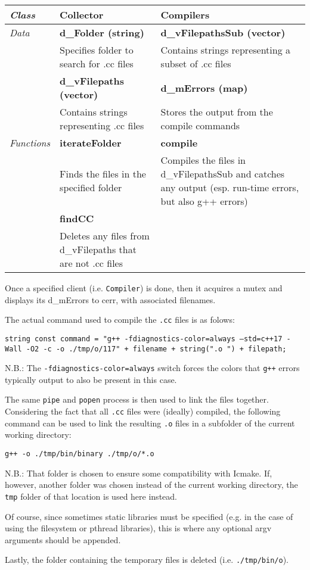 \begin{table}[H]
\begin{tabularx}{\linewidth}{l|XX}
\textit{\textbf{Class}} & \textbf{Collector} & \textbf{Compilers} \\ \hline
\textit{Data} & \textbf{d\_Folder (string)} & \textbf{d\_vFilepathsSub (vector)} \\
 & Specifies folder to search for .cc files & Contains strings representing a subset of .cc files	 \\
 & \textbf{d\_vFilepaths (vector)} & \textbf{d\_mErrors (map)} \\
 & Contains strings representing .cc files & Stores the output from the compile commands \\ \hline
\textit{Functions} & \textbf{iterateFolder} & \textbf{compile} \\
 & Finds the files in the specified folder & Compiles the files in d\_vFilepathsSub and catches any output (esp. run-time errors, but also g++ errors) \\
 & \textbf{findCC} &  \\
 & Deletes any files from d\_vFilepaths that are not .cc files	 &  \\ \hline
\end{tabularx}
\end{table}

Once a specified client (i.e. \texttt{Compiler}) is done, then it acquires a mutex and displays its d\_mErrors to cerr, with associated filenames.

The actual command used to compile the \texttt{.cc} files is as folows:

\texttt{string const command = "g++ -fdiagnostics-color=always --std=c++17 -Wall -O2 -c -o ./tmp/o/117" + filename + string(".o ") + filepath;}

N.B.: The \texttt{-fdiagnostics-color=always} switch forces the colors that \texttt{g++} errors typically output to also be present in this case.

The same \texttt{pipe} and \texttt{popen} process is then used to link the files together. Considering the fact that all \texttt{.cc} files were (ideally) compiled, the following command can be used to link the resulting \texttt{.o} files in a subfolder of the current working directory:

\texttt{g++ -o ./tmp/bin/binary ./tmp/o/*.o}

N.B.: That folder is chosen to ensure some compatibility with Icmake. If, however, another folder was chosen instead of the current working directory, the \texttt{tmp} folder of that location is used here instead.

Of course, since sometimes static libraries must be specified (e.g. in the case of using the filesystem or pthread libraries), this is where any optional argv arguments should be appended.

Lastly, the folder containing the temporary files is deleted (i.e. \texttt{./tmp/bin/o}).

